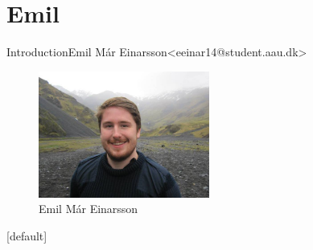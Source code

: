 \section{Emil}


\begin{frame}{Introduction}{Emil Már Einarsson\newline<eeinar14@student.aau.dk>}
	\begin{figure}[h!]
    	\includegraphics[width=0.5\textwidth]{images/emil.jpg}
    	\caption{Emil Már Einarsson}
		\centering    		
	\end{figure}
\end{frame}

[default]